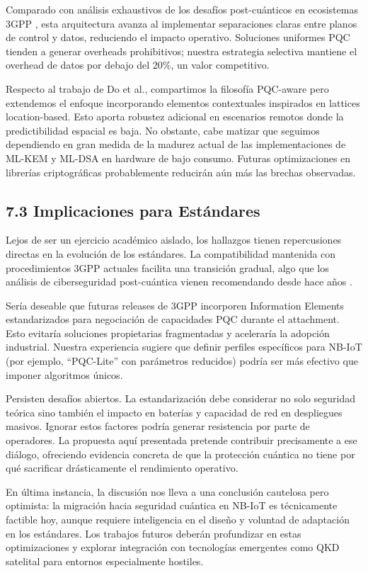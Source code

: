 Comparado con análisis exhaustivos de los desafíos post-cuánticos en ecosistemas 3GPP \cite{Althobaiti2020_Cybersecurity}, esta arquitectura avanza al implementar separaciones claras entre planos de control y datos, reduciendo el impacto operativo. Soluciones uniformes PQC tienden a generar overheads prohibitivos; nuestra estrategia selectiva mantiene el overhead de datos por debajo del 20\%, un valor competitivo.

Respecto al trabajo de Do et al., compartimos la filosofía PQC-aware pero extendemos el enfoque incorporando elementos contextuales inspirados en lattices location-based. Esto aporta robustez adicional en escenarios remotos donde la predictibilidad espacial es baja. No obstante, cabe matizar que seguimos dependiendo en gran medida de la madurez actual de las implementaciones de ML-KEM y ML-DSA en hardware de bajo consumo. Futuras optimizaciones en librerías criptográficas probablemente reducirán aún más las brechas observadas.

\subsection{7.3 Implicaciones para Estándares}

Lejos de ser un ejercicio académico aislado, los hallazgos tienen repercusiones directas en la evolución de los estándares. La compatibilidad mantenida con procedimientos 3GPP actuales facilita una transición gradual, algo que los análisis de ciberseguridad post-cuántica vienen recomendando desde hace años \cite{Althobaiti2020_Cybersecurity}.

Sería deseable que futuras releases de 3GPP incorporen Information Elements estandarizados para negociación de capacidades PQC durante el attachment. Esto evitaría soluciones propietarias fragmentadas y aceleraría la adopción industrial. Nuestra experiencia sugiere que definir perfiles específicos para NB-IoT (por ejemplo, ``PQC-Lite'' con parámetros reducidos) podría ser más efectivo que imponer algoritmos únicos.

Persisten desafíos abiertos. La estandarización debe considerar no solo seguridad teórica sino también el impacto en baterías y capacidad de red en despliegues masivos. Ignorar estos factores podría generar resistencia por parte de operadores. La propuesta aquí presentada pretende contribuir precisamente a ese diálogo, ofreciendo evidencia concreta de que la protección cuántica no tiene por qué sacrificar drásticamente el rendimiento operativo.

En última instancia, la discusión nos lleva a una conclusión cautelosa pero optimista: la migración hacia seguridad cuántica en NB-IoT es técnicamente factible hoy, aunque requiere inteligencia en el diseño y voluntad de adaptación en los estándares. Los trabajos futuros deberán profundizar en estas optimizaciones y explorar integración con tecnologías emergentes como QKD satelital para entornos especialmente hostiles.